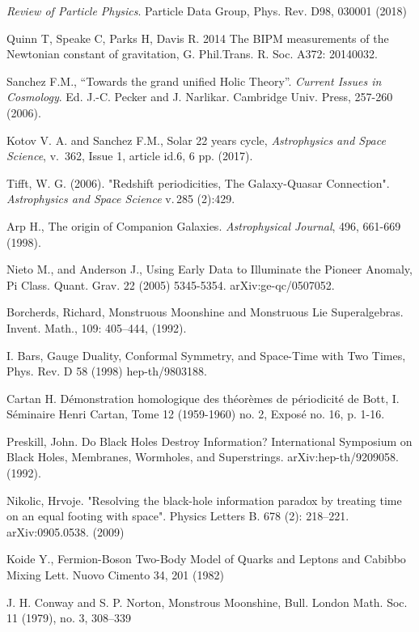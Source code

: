 \documentclass[twoside,draft]{article}
\begin{document}
\begin{sloppypar}
{\begin{thebibliography}{99}
 \textit{Review of Particle Physics}. Particle Data Group, Phys. Rev. D98, 030001 (2018)

 Quinn T, Speake C, Parks H, Davis R. 2014 The BIPM measurements of the Newtonian
constant of gravitation, G. Phil.Trans. R. Soc. A372: 20140032. %

 Sanchez F.M., “Towards the grand unified Holic Theory”. \textit{Current Issues in Cosmology}. Ed. J.-C.
Pecker and J. Narlikar. Cambridge Univ. Press, 257-260 (2006).

 Kotov V. A. and Sanchez F.M., Solar 22 years cycle, \textit{Astrophysics and Space Science}, v.\, 362,
Issue 1, article id.6, 6 pp. (2017).

 Tifft, W. G. (2006). "Redshift periodicities, The Galaxy-Quasar Connection". \textit{Astrophysics and
Space Science} v.\,285 (2):429.

 Arp H., The origin of Companion Galaxies. \textit{Astrophysical Journal}, 496, 661-669 (1998).

 Nieto M., and Anderson J., Using Early Data to Illuminate the Pioneer Anomaly, Pi Class.
Quant. Grav. 22 (2005) 5345-5354. arXiv:ge-qc/0507052.

 Borcherds, Richard, Monstruous Moonshine and Monstruous Lie Superalgebras. Invent.
Math., 109: 405–444, (1992).

 I. Bars, Gauge Duality, Conformal Symmetry, and Space-Time with Two Times, Phys. Rev. D
58 (1998) hep-th/9803188.

 Cartan H. Démonstration homologique des théorèmes de périodicité de Bott, I. Séminaire
Henri Cartan, Tome 12 (1959-1960) no. 2, Exposé no. 16, p. 1-16.

 Preskill, John. Do Black Holes Destroy Information? International Symposium on Black Holes,
Membranes, Wormholes, and Superstrings. arXiv:hep-th/9209058. (1992).

 Nikolic, Hrvoje. "Resolving the black-hole information paradox by treating time on an equal
footing with space". Physics Letters B. 678 (2): 218–221. arXiv:0905.0538. (2009)

 Koide Y., Fermion-Boson Two-Body Model of Quarks and Leptons and Cabibbo Mixing Lett.
Nuovo Cimento 34, 201 (1982)

 J. H. Conway and S. P. Norton, Monstrous Moonshine, Bull. London Math. Soc. 11 (1979), no.
3, 308–339


\end{thebibliography}}
\end{sloppypar}
\end{document}

